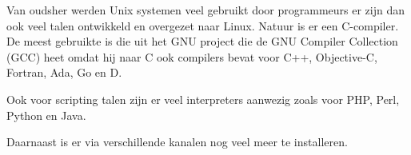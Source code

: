 Van oudsher werden Unix systemen veel gebruikt door programmeurs er zijn dan ook veel talen ontwikkeld en overgezet naar
Linux. Natuur is er een C-compiler. De meest gebruikte is die uit het GNU project die de GNU Compiler Collection (GCC)
heet omdat hij naar C ook compilers bevat voor C++, Objective-C,
Fortran, Ada, Go en D.

Ook voor scripting talen zijn er veel \foreignlanguage{english}{interpreters} aanwezig zoals voor PHP, Perl, Python en Java.

Daarnaast is er via verschillende kanalen nog veel meer te installeren.

